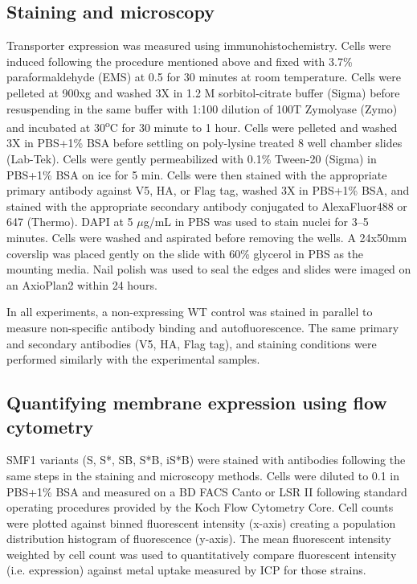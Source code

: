 \documentclass[../main/main]{subfiles}
\begin{document}
\subsection*{Staining and microscopy}
Transporter expression was measured using immunohistochemistry. Cells were induced following the procedure mentioned above and fixed with 3.7\% paraformaldehyde (EMS) at 0.5 \OD{} for 30 minutes at room temperature. Cells were pelleted at 900xg and washed 3X in 1.2 M sorbitol-citrate buffer (Sigma) before resuspending in the same buffer with 1:100 dilution of 100T Zymolyase (Zymo) and incubated at 30\textsuperscript{o}C for 30 minute to 1 hour. Cells were pelleted and washed 3X in PBS+1\% BSA before settling on poly-lysine treated 8 well chamber slides (Lab-Tek). Cells were gently permeabilized with 0.1\% Tween-20 (Sigma) in PBS+1\% BSA on ice for 5 min. Cells were then stained with the appropriate primary antibody against V5, HA, or Flag tag, washed 3X in PBS+1\% BSA, and stained with the appropriate secondary antibody conjugated to AlexaFluor488 or 647 (Thermo). DAPI at 5 $\mu$g/mL in PBS was used to stain nuclei for 3--5 minutes. Cells were washed and aspirated before removing the wells. A 24x50mm coverslip was placed gently on the slide with 60\% glycerol in PBS as the mounting media. Nail polish was used to seal the edges and slides were imaged on an AxioPlan2 within 24 hours.

In all experiments, a non-expressing WT control was stained in parallel to measure non-specific antibody binding and autofluorescence. The same primary and secondary antibodies (V5, HA, Flag tag), and staining conditions were performed similarly with the experimental samples.

\subsection*{Quantifying membrane expression using flow cytometry}
SMF1 variants (S, S*, SB, S*B, iS*B) were stained with antibodies following the same steps in the staining and microscopy methods. Cells were diluted to 0.1 \OD in PBS+1\% BSA and measured on a BD FACS Canto or LSR II following standard operating procedures provided by the Koch Flow Cytometry Core. Cell counts were plotted against binned fluorescent intensity (x-axis) creating a population distribution histogram of fluorescence (y-axis). The mean fluorescent intensity weighted by cell count was used to quantitatively compare fluorescent intensity (i.e. expression) against metal uptake measured by ICP for those strains.
\end{document}
